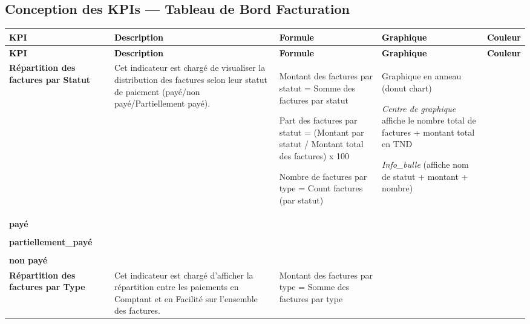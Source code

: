 \newpage

\subsection*{Conception des KPIs — Tableau de Bord Facturation}

\begin{longtable}{|>{\centering\arraybackslash\bfseries}p{2.5cm}|>{\raggedright\arraybackslash}p{3.5cm}|>{\raggedright\arraybackslash}p{4cm}|>{\centering\arraybackslash}p{1.8cm}|>{\centering\arraybackslash}p{1.5cm}|}
\hline
\rowcolor{blue!20}
\textcolor{black}{\textbf{KPI}} &
\textcolor{black}{\textbf{Description}} &
\textcolor{black}{\textbf{Formule}} &
\textcolor{black}{\textbf{Graphique}} &
\textcolor{black}{\textbf{Couleur}} \\
\hline
\endfirsthead
\hline
\rowcolor{blue!20}
\textcolor{black}{\textbf{KPI}} &
\textcolor{black}{\textbf{Description}} &
\textcolor{black}{\textbf{Formule}} &
\textcolor{black}{\textbf{Graphique}} &
\textcolor{black}{\textbf{Couleur}} \\
\hline
\endhead
Répartition des factures par Statut &
Cet indicateur est chargé de visualiser la distribution des factures selon leur statut de paiement (payé/non payé/Partiellement payé). &
Montant des factures par statut = Somme des factures par statut

\vspace{4pt}
Part des factures par statut = (Montant par statut / Montant total des factures) x 100

\vspace{4pt}
Nombre de factures par type = Count factures (par statut) &
Graphique en anneau (donut chart)

\vspace{4pt}
\textit{Centre de graphique} affiche le nombre total de factures + montant total en TND

\vspace{4pt}
\textit{Info\_bulle} (affiche nom de statut + montant + nombre) &
\begin{tabular}[c]{@{}c@{}}
{green!60!black}\\[-2pt]
{\tiny payé}\\[6pt]
{orange!80}\\[-2pt]
{\tiny partiellement\_payé}\\[6pt]
{red!70}\\[-2pt]
{\tiny non payé}
\end{tabular} \\
\hline
Répartition des factures par Type &
Cet indicateur est chargé d'afficher la répartition entre les paiements en Comptant et en Facilité sur l'ensemble des factures. &
Montant des factures par type = Somme des factures par type


\end{longtable}
